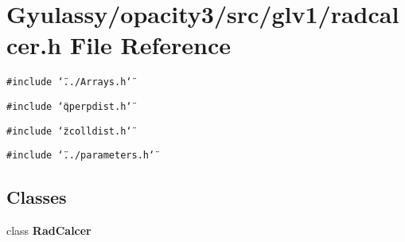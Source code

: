 \section{Gyulassy/opacity3/src/glv1/radcalcer.h File Reference}
\label{radcalcer_8h}
{\tt \#include \char`\"{}../Arrays.h\char`\"{}}\par
{\tt \#include \char`\"{}qperpdist.h\char`\"{}}\par
{\tt \#include \char`\"{}zcolldist.h\char`\"{}}\par
{\tt \#include \char`\"{}../parameters.h\char`\"{}}\par
\subsection*{Classes}
\begin{CompactItemize}
\item 
class {\bf RadCalcer}
\end{CompactItemize}
